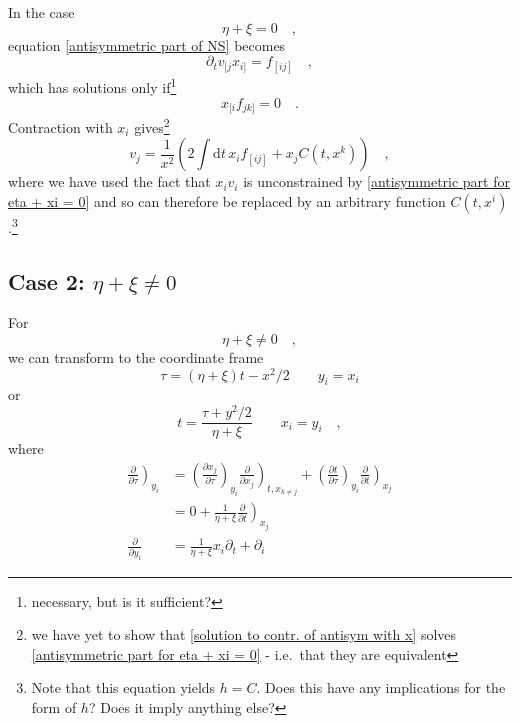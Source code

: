 \documentclass[10pt,a4paper]{article}
\newcommand{\ud}{\mathrm{d}}
\begin{document}
In the case
\begin{equation}
\eta + \xi = 0\quad,
\end{equation}
equation \eqref{antisymmetric part of NS} becomes
\begin{equation}
\partial_t v_{[j} x_{i]} = f_{[ij]}		\quad,
\label{antisymmetric part for eta + xi = 0}
\end{equation}
which has solutions only if\footnote{necessary, but is it sufficient?}
\begin{equation}
x_{[i} f_{jk]} = 0    \quad.
\end{equation}
Contraction with $x_i$ gives\footnote{we have yet to show that \eqref{solution to contr. of antisym with x} solves \eqref{antisymmetric part for eta + xi = 0} - i.e.\ that they are equivalent}
\begin{equation}
v_j	=	\frac{1}{x^2}
		\left(
			2 \int \ud t \, x_i f_{[ij]} + x_j C(t,x^k)
		\right)\quad,
\label{solution to contr. of antisym with x}
\end{equation}
where we have used the fact that $x_i v_i$ is unconstrained by \eqref{antisymmetric part for eta + xi = 0} and so can therefore be replaced by an arbitrary function $C(t,x^i)$.\footnote{Note that this equation yields $h = C$. Does this have any implications for the form of $h$? Does it imply anything else?}

\subsection{Case 2: $\eta + \xi \neq 0$}

For
\[
	\eta + \xi \neq 0	\quad,
\]
we can transform to the coordinate frame
\begin{equation}
\tau =	(\eta + \xi) t - x^2/2
\qquad
y_i =	x_i
\end{equation}
or
\begin{equation}
t = \frac{\tau + y^2/2}{\eta + \xi}
\qquad
x_i = y_i \quad,
\end{equation}
where
\begin{align}
\left. \frac{\partial }{\partial \tau} \right)_{y_i}
	& = \left( \frac{\partial x_j}{\partial \tau} \right)_{y_i} \left. \frac{\partial }{\partial x_j} \right)_{t, x_{k\neq j}} + \left( \frac{\partial t}{\partial \tau} \right)_{y_i} \left. \frac{\partial }{\partial t} \right)_{x_j}
\\	& = 0 + \frac{1}{\eta+\xi} \left. \frac{\partial }{\partial t} \right)_{x_j}
\\
\frac{\partial}{\partial y_i} & = \frac{1}{\eta + \xi} x_i\partial_t + \partial_i
\end{align}
\end{document}
